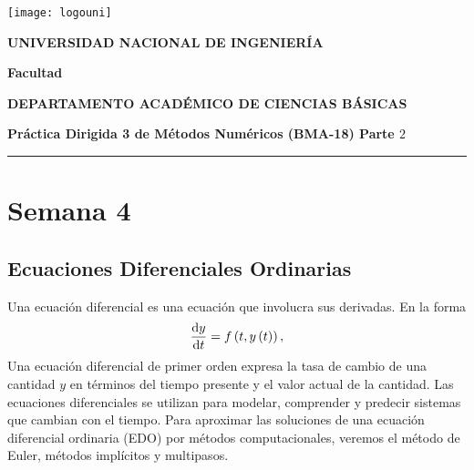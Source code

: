 


\providecommand{\faculty}{Facultad}
\noindent\parbox[c]{.18\textwidth}{\texttt{[image: logouni]}}\hfill
\parbox[c]{1\textwidth}{\raggedright%
    {\large\textbf{UNIVERSIDAD NACIONAL DE INGENIERÍA} \par\smallskip}
    {\large\textbf{\faculty} \par\smallskip}
    {\large\textbf{DEPARTAMENTO ACADÉMICO DE CIENCIAS BÁSICAS} \par\smallskip}
}

\begin{center}\bfseries\large
    Práctica Dirigida 3 de Métodos Numéricos (BMA-18)
    Parte $2$
\end{center}

\vspace{-0.5cm}

\hrulefill
\vspace{-2.5mm}

\rule{16.5cm}{0.8mm}

\section{Semana 4}

\subsection{Ecuaciones Diferenciales Ordinarias}

Una ecuación diferencial es una ecuación que involucra sus derivadas.
En la forma
\begin{equation*}
    \diff{y}{t}=f\left(t,y\left(t\right)\right),
\end{equation*}
Una ecuación diferencial de primer orden expresa la tasa de cambio de
una cantidad $y$ en términos del tiempo presente y el valor actual de
la cantidad.
Las ecuaciones diferenciales se utilizan para modelar, comprender y
predecir sistemas que cambian con el tiempo.
Para aproximar las soluciones de una ecuación diferencial ordinaria
(EDO) por métodos computacionales, veremos el método de Euler,
métodos implícitos y multipasos.

